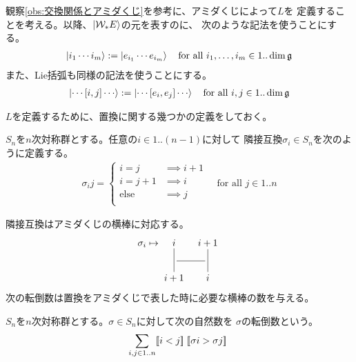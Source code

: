 {	観察\ref{obs:交換関係とアミダくじ}を参考に、アミダくじによって$L$を
	定義することを考える。以降、$\mathinner{|{{\ensuremath{{\mathcal{W}}}}_*E}\rangle}$の元を表すのに、
	次のような記法を使うことにする。
	\begin{equation*}\begin{split}
		\mathinner{|{i_1\cdots i_m}\rangle} := \mathinner{|{e_{i_1}\cdots e_{i_m}}\rangle}
		\quad\text{for all } i_1,\dots,i_m\in 1..\dim{\mathfrak{g}}
	\end{split}\end{equation*}
	また、Lie括弧も同様の記法を使うことにする。
	\begin{equation*}\begin{split}
		\mathinner{|{\cdots[i,j]\cdots}\rangle} := \mathinner{|{\cdots[e_i,e_j]\cdots}\rangle}
		\quad\text{for all } i,j\in 1..\dim{\mathfrak{g}}
	\end{split}\end{equation*}

	$L$を定義するために、置換に関する幾つかの定義をしておく。

	\begin{definition}
	\label{def:隣接互換} %
		$S_n$を$n$次対称群とする。任意の$i\in 1..(n-1)$に対して
		隣接互換$\sigma_i\in S_n$を次のように定義する。
		\begin{equation*}\begin{split}
			\sigma_ij = \left\{\begin{split}
				i = j &\implies i + 1 \\
				i = j + 1 &\implies i \\
				\text{else} &\implies j \\
			\end{split}\right. \quad\text{for all } j\in 1..n
		\end{split}\end{equation*}
	\end{definition} %

	隣接互換はアミダくじの横棒に対応する。
	\begin{equation*}\begin{split}
		\sigma_i\mapsto \xymatrix@R=2ex@C=2ex{
			i \ar@{-}[dd] & i + 1 \ar@{-}[dd] \\
			\ar@{-}[r] & \\
			i + 1 & i \\
		}
	\end{split}\end{equation*}
	次の転倒数は置換をアミダくじで表した時に必要な横棒の数を与える。

	\begin{definition}
	\label{def:転倒数} %
		$S_n$を$n$次対称群とする。$\sigma\in S_n$に対して次の自然数を
		$\sigma$の転倒数という。
		\begin{equation*}\begin{split}
			\sum_{i,j\in 1..n} [\![i < j]\!]\;[\![\sigma i > \sigma j]\!]\;
		\end{split}\end{equation*}
	\end{definition} %

}
